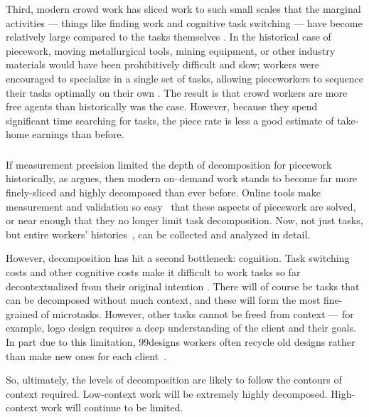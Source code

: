 \documentclass[trackingWork]{subfiles}
\begin{document}
Third, modern crowd work has sliced work to such small scales that the marginal activities
--- things like finding work and cognitive task switching ---
have become relatively large compared to the tasks themselves
\cite{taskSearch}.
In the historical case of piecework,
moving metallurgical tools, mining equipment, or
other industry materials would have been prohibitively difficult and slow;
workers were encouraged to specialize in a single set of tasks,
allowing pieceworkers to sequence their tasks optimally on their own
\cite{hart2013rise}.
The result is that crowd workers are more free agents than historically was the case.
However, because they spend significant time searching for tasks, the piece rate is less a good estimate of take-home earnings than before.

 



\subsubsection{\implication}
If measurement precision limited the depth of decomposition for piecework historically, as \citeauthor{10.2307/23702539} argues, then modern on--demand work stands to become far more finely-sliced and highly decomposed than ever before.
Online tools make measurement and validation so easy~\cite{rzeszotarski2011instrumenting} that these aspects of piecework are solved, or near enough that they no longer limit task decomposition.
Now, not just tasks, but entire workers' histories~\cite{hata2017glimpse}, can be collected and analyzed in detail.

However, decomposition has hit a second bottleneck: cognition. 
Task switching costs and other cognitive costs make it difficult to work tasks so far decontextualized from their original intention \cite{delayAndOrderLasecki}.
There will of course be tasks that can be decomposed without much context, and these will form the most fine-grained of microtasks.
However, other tasks cannot be freed from context --- for example, logo design requires a deep understanding of the client and their goals.
In part due to this limitation, 99designs workers often recycle old designs rather than make new ones for each client~\cite{araujo201399designs}.

So, ultimately, the levels of decomposition are likely to follow the contours of context required. Low-context work will be extremely highly decomposed. High-context work will continue to be limited.


\end{document}

